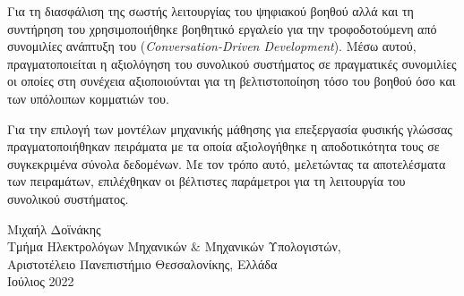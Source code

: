 
Για τη διασφάλιση της σωστής λειτουργίας του ψηφιακού βοηθού αλλά και τη συντήρηση του χρησιμοποιήθηκε βοηθητικό εργαλείο για την τροφοδοτούμενη από συνομιλίες ανάπτυξη του (\emph{Conversation-Driven Development}). Μέσω αυτού, πραγματοποιείται η αξιολόγηση του συνολικού συστήματος σε πραγματικές συνομιλίες οι οποίες στη συνέχεια αξιοποιούνται για τη βελτιστοποίηση τόσο του βοηθού όσο και των υπόλοιπων κομματιών του.

Για την επιλογή των μοντέλων μηχανικής μάθησης για επεξεργασία φυσικής γλώσσας πραγματοποιήθηκαν πειράματα με τα οποία αξιολογήθηκε η αποδοτικότητα τους σε συγκεκριμένα σύνολα δεδομένων. Με τον τρόπο αυτό, μελετώντας τα αποτελέσματα των πειραμάτων, επιλέχθηκαν οι βέλτιστες παράμετροι για τη λειτουργία του συνολικού συστήματος.

\begin{flushright}
  \vspace{1cm}
  Μιχαήλ Δοϊνάκης
  \\
  Τμήμα Ηλεκτρολόγων Μηχανικών $\&$ Μηχανικών Υπολογιστών,
  \\
  Αριστοτέλειο Πανεπιστήμιο Θεσσαλονίκης, Ελλάδα
  \\
  Ιούλιος 2022
\end{flushright}